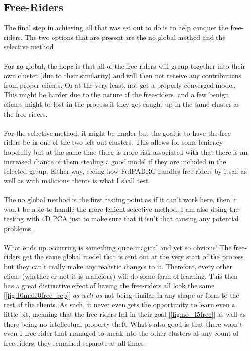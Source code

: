 \subsection{Free-Riders}
The final step in achieving all that was set out to do is to help conquer the free-riders.
The two options that are present are the no global method and the selective method.
\\ \\
For no global, the hope is that all of the free-riders will group together into their own cluster (due to their similarity) and will then not receive any contributions from proper clients.
Or at the very least, not get a properly converged model.
This might be harder due to the nature of the free-riders, and a few benign clients might be lost in the process if they get caught up in the same cluster as the free-riders.
\\ \\
For the selective method, it might be harder but the goal is to have the free-riders be in one of the two left-out clusters.
This allows for some leniency hopefully but at the same time there is more risk associated with that there is an increased chance of them stealing a good model if they are included in the selected group.
Either way, seeing how FedPADRC handles free-riders by itself as well as with malicious clients is what I shall test.
\\ \\
The no global method is the first testing point as if it can't work here, then it won't be able to handle the more lenient selective method.
I am also doing the testing with 4D PCA just to make sure that it isn't that causing any potential problems.
\\ \\
What ends up occurring is something quite magical and yet so obvious!
The free-riders get the same global model that is sent out at the very start of the process but they can't really make any realistic changes to it.
Therefore, every other client (whether or not it is malicious) will do some form of learning.
This then has a great distinctive effect of having the free-riders all look the same [\ref{fig:10mal10free_rep}] \textit{as well as} not being similar in any shape or form to the rest of the clients.
As such, it never even gets the opportunity to learn even a little bit, meaning that the free-riders fail in their goal [\ref{fig:no_15free}] as well as there being no intellectual property theft.
What's also good is that there wasn't even 1 free-rider that managed to sneak into the other clusters at any count of free-riders, they remained separate at all times.

